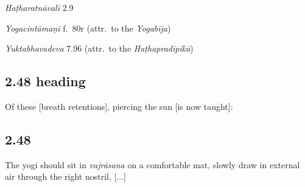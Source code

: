 \begin{ekdosis}

\begin{testimonia}[hp02_047]
\emph{Haṭharatnāvalī} 2.9
\begin{versinnote}
\end{versinnote} 

\emph{Yogacintāmaṇī} f.~80r (attr.~to the \emph{Yogabīja})

\begin{versinnote}
\end{versinnote}

\emph{Yuktabhavadeva} 7.96 (attr.~to the \emph{Haṭhapradīpikā})

\begin{versinnote}
\end{versinnote}
\end{testimonia}


\subsection*{2.48 heading}
\begin{translation}[hp02_048a]
Of these [breath retentions], piercing the sun [is now taught]: 
\end{translation}


\subsection*{2.48}
\begin{translation}[hp02_048]
The yogi should sit in \emph{vajrāsana} on a comfortable mat, slowly draw in external air through the right nostril, [...]
\end{translation}


\end{ekdosis}
